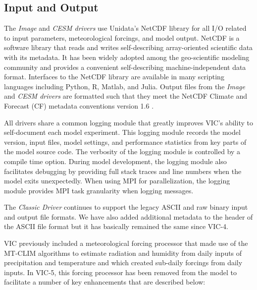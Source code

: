 \documentclass[gmd, manuscript]{copernicus}
\begin{document}
  \subsection{Input and Output}
    \label{sec:io}
    The \textit{Image} and \textit{CESM drivers} use Unidata's NetCDF library for all I/O related to input parameters, meteorological forcings, and model output. NetCDF is a software library that reads and writes self-describing array-oriented scientific data with its metadata. It has been widely adopted among the geo-scientific modeling community and provides a convenient self-describing machine-independent data format. Interfaces to the NetCDF library are available in many scripting languages including Python, R, Matlab, and Julia. Output files from the \textit{Image} and \textit{CESM drivers} are formatted such that they meet the NetCDF Climate and Forecast (CF) metadata conventions version 1.6 \citep{Eaton_2003}.

    All drivers share a common logging module that greatly improves VIC's ability to self-document each model experiment. This logging module records the model version, input files, model settings, and performance statistics from key parts of the model source code. The verbosity of the logging module is controlled by a compile time option. During model development, the logging module also facilitates debugging by providing full stack traces and line numbers when the model exits unexpectedly. When using MPI for parallelization, the logging module provides MPI task granularity when logging messages.

    The \textit{Classic Driver} continues to support the legacy ASCII and raw binary input and output file formats. We have also added additional metadata to the header of the ASCII file format but it has basically remained the same since VIC-4.

    VIC previously included a meteorological forcing processor that made use of the MT-CLIM algorithms to estimate radiation and humidity from daily inputs of precipitation and temperature and which created sub-daily forcings from daily inputs. In VIC-5, this forcing processor has been removed from the model to facilitate a number of key enhancements that are described below:
\end{document}
